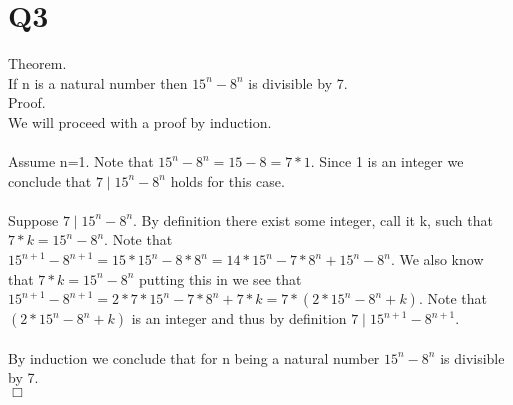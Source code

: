 \documentclass[12pt,a4paper]{article}
\begin{document}
\section{Q3}
Theorem.\\
If n is a natural number then $15^n-8^n$ is divisible by 7.\\
Proof.\\
We will proceed with a proof by induction.\\\\
Assume n=1.  Note that $15^n-8^n=15-8=7*1$.  Since 1 is an integer we conclude that $7\mid 15^n-8^n$ holds for this case.\\\\
Suppose $7\mid 15^n-8^n$.  By definition there exist some integer, call it k, such that $7*k=15^n-8^n$.  Note that $15^{n+1}-8^{n+1}=15*15^{n}-8*8^{n}=14*15^{n}-7*8^{n}+15^{n}-8^{n}$.  We also know that $7*k=15^n-8^n$ putting this in we see that $15^{n+1}-8^{n+1}=2*7*15^{n}-7*8^{n}+7*k=7*(2*15^{n}-8^{n}+k)$.  Note that $(2*15^{n}-8^{n}+k)$ is an integer and thus by definition $7\mid15^{n+1}-8^{n+1}$.\\\\
By induction we conclude that for n being a natural number $15^n-8^n$ is divisible by 7.\\
$\Box$
\end{document}
